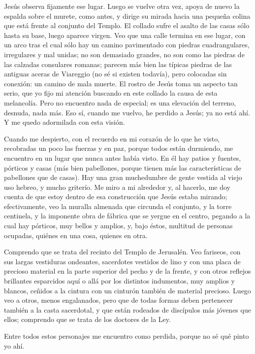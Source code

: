 \documentclass[12pt, twoside, openright]{book} %
\begin{document}
Jesús observa fijamente ese lugar. Luego se vuelve otra vez, apoya de nuevo la espalda sobre el murete, como antes, y dirige su mirada hacia una pequeña colina que está frente al conjunto del Templo. El collado sufre el asalto de las casas sólo hasta su base, luego aparece virgen. Veo que una calle termina en ese lugar, con un arco tras el cual sólo hay un camino pavimentado con piedras cuadrangulares, irregulares y mal unidas; no son demasiado grandes, no son como las piedras de las calzadas consulares romanas; parecen más bien las típicas piedras de las antiguas aceras de Viareggio (no sé si existen todavía), pero colocadas sin conexión: un camino de mala muerte. El rostro de Jesús toma un aspecto tan serio, que yo fijo mi atención buscando en este collado la causa de esta melancolía. Pero no encuentro nada de especial; es una elevación del terreno, desnuda, nada más. Eso sí, cuando me vuelvo, he perdido a Jesús; ya no está ahí. Y me quedo adormilada con esta visión. 

Cuando me despierto, con el recuerdo en mi corazón de lo que he visto, recobradas un poco las fuerzas y en paz, porque todos están durmiendo, me encuentro en un lugar que nunca antes había visto. En él hay patios y fuentes, pórticos y casas (más bien pabellones, porque tienen más las características de pabellones que de casas). Hay una gran muchedumbre de gente vestida al viejo uso hebreo, y mucho griterío. Me miro a mi alrededor y, al hacerlo, me doy cuenta de que estoy dentro de esa construcción que Jesús estaba mirando; efectivamente, veo la muralla almenada que circunda el conjunto, y la torre centinela, y la imponente obra de fábrica que se yergue en el centro, pegando a la cual hay pórticos, muy bellos y amplios, y, bajo éstos, multitud de personas ocupadas, quiénes en una cosa, quienes en otra. 

Comprendo que se trata del recinto del Templo de Jerusalén. Veo fariseos, con sus largas vestiduras ondeantes, sacerdotes vestidos de lino y con una placa de precioso material en la parte superior del pecho y de la frente, y con otros reflejos brillantes esparcidos aquí o allá por los distintos indumentos, muy amplios y blancos, ceñidos a la cintura con un cinturón también de material precioso. Luego veo a otros, menos engalanados, pero que de todas formas deben pertenecer también a la casta sacerdotal, y que están rodeados de discípulos más jóvenes que ellos; comprendo que se trata de los doctores de la Ley. 

Entre todos estos personajes me encuentro como perdida, porque no sé qué pinto yo ahí. 
\end{document}
